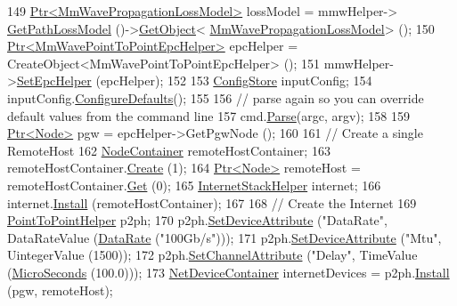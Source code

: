 \begin{DoxyCode}
149   \hyperlink{classns3_1_1Ptr}{Ptr<MmWavePropagationLossModel>} lossModel = mmwHelper->
      \hyperlink{classns3_1_1MmWaveHelper_a377d1c8c4c43a88801e905d88b8a5740}{GetPathLossModel} ()->\hyperlink{classns3_1_1Object_a13e18c00017096c8381eb651d5bd0783}{GetObject}<
      \hyperlink{classMmWavePropagationLossModel}{MmWavePropagationLossModel}> ();
150   \hyperlink{classns3_1_1Ptr}{Ptr<MmWavePointToPointEpcHelper>}  epcHelper = 
      CreateObject<MmWavePointToPointEpcHelper> ();
151   mmwHelper->\hyperlink{classns3_1_1MmWaveHelper_a54fc98a649a710153b479d0878558733}{SetEpcHelper} (epcHelper);
152 
153   \hyperlink{classns3_1_1ConfigStore}{ConfigStore} inputConfig;
154   inputConfig.\hyperlink{classns3_1_1ConfigStore_a0a6137574d7c847c3823af8b9d1bb886}{ConfigureDefaults}();
155 
156   \textcolor{comment}{// parse again so you can override default values from the command line}
157   cmd.\hyperlink{classns3_1_1CommandLine_a5c10b85b3207e5ecb48d907966923156}{Parse}(argc, argv);
158 
159   \hyperlink{classns3_1_1Ptr}{Ptr<Node>} pgw = epcHelper->GetPgwNode ();
160 
161   \textcolor{comment}{// Create a single RemoteHost}
162   \hyperlink{classns3_1_1NodeContainer}{NodeContainer} remoteHostContainer;
163   remoteHostContainer.\hyperlink{classns3_1_1NodeContainer_a787f059e2813e8b951cc6914d11dfe69}{Create} (1);
164   \hyperlink{classns3_1_1Ptr}{Ptr<Node>} remoteHost = remoteHostContainer.\hyperlink{classns3_1_1NodeContainer_a9ed96e2ecc22e0f5a3d4842eb9bf90bf}{Get} (0);
165   \hyperlink{classns3_1_1InternetStackHelper}{InternetStackHelper} internet;
166   internet.\hyperlink{classns3_1_1InternetStackHelper_a6645b412f31283d2d9bc3d8a95cebbc0}{Install} (remoteHostContainer);
167 
168   \textcolor{comment}{// Create the Internet}
169   \hyperlink{classns3_1_1PointToPointHelper}{PointToPointHelper} p2ph;
170   p2ph.\hyperlink{classns3_1_1PointToPointHelper_a4577f5ab8c387e5528af2e0fbab1152e}{SetDeviceAttribute} (\textcolor{stringliteral}{"DataRate"}, DataRateValue (\hyperlink{classns3_1_1DataRate}{DataRate} (\textcolor{stringliteral}{"100Gb/s"})));
171   p2ph.\hyperlink{classns3_1_1PointToPointHelper_a4577f5ab8c387e5528af2e0fbab1152e}{SetDeviceAttribute} (\textcolor{stringliteral}{"Mtu"}, UintegerValue (1500));
172   p2ph.\hyperlink{classns3_1_1PointToPointHelper_a6b5317fd17fb61e5a53f8d66a90b63b9}{SetChannelAttribute} (\textcolor{stringliteral}{"Delay"}, TimeValue (\hyperlink{group__timecivil_ga17465a639c8d1464e76538afdd78a9f0}{MicroSeconds} (100.0)));
173   \hyperlink{classns3_1_1NetDeviceContainer}{NetDeviceContainer} internetDevices = p2ph.\hyperlink{classns3_1_1PointToPointHelper_ab9162fea3e88722666fed1106df1f9ec}{Install} (pgw, remoteHost);

\end{DoxyCode}

